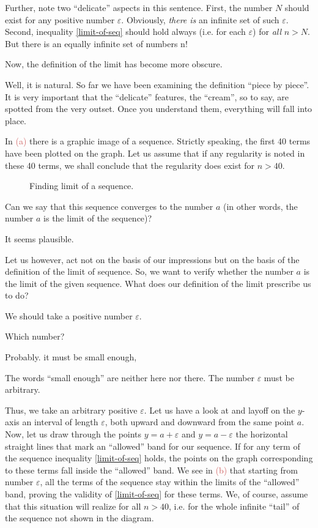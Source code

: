 {Further, note two ``delicate'' aspects in this sentence. First, the number $N$ should exist for any positive number $\varepsilon$. Obviously, \emph{there is} an infinite set of such $\varepsilon$. Second, inequality \eqref{limit-of-seq} should hold always (i.e. for each $\varepsilon$) for \emph{all} $n > N$. But there is an equally infinite set of numbers n!

\rdr Now, the definition of the limit has become more obscure.

\athr Well, it is natural. So far we have been examining the definition ``piece by piece''. It is very important that the ``delicate'' features, the ``cream'', so to say, are spotted from the very outset. Once you understand them, everything will fall into place.

In \textcolor{IndianRed}{(a)} there is a graphic image of a sequence. Strictly speaking, the first 40 terms have been plotted on the graph. Let us assume that if any regularity is noted in these 40 terms, we shall conclude that the regularity does exist for $n > 40$.

\begin{figure}[!h]
\centering

\caption{Finding limit of a sequence.}
\label{fig-07}
\end{figure}

Can we say that this sequence converges to the number $a$ (in other words, the number $a$ is the limit of the sequence)?

\rdr It seems plausible.

\athr Let us however, act not on the basis of our impressions but on the basis of the definition of the limit of sequence. So, we want to verify whether the number $a$ is the limit of the given sequence. What does our definition of the limit prescribe us to do?

\rdr We should take a positive number $\varepsilon$. 

\athr Which number? 

\rdr Probably. it must be small enough,

\athr The words ``small enough'' are neither here nor there. The number $\varepsilon$ must be arbitrary.

Thus, we take an arbitrary positive $\varepsilon$. Let us have a look at  and layoff on the $y$-axis an interval of length $\varepsilon$, both upward and downward from the same point $a$. Now, let us draw through the points $y = a + \varepsilon$ and $y = a - \varepsilon$ the horizontal straight lines that mark an ``allowed'' band for our sequence. If for any term of the sequence inequality \eqref{limit-of-seq} holds, the points on the graph corresponding to these terms fall inside the ``allowed'' band. We see  in \textcolor{IndianRed}{(b)} that starting from number $\varepsilon$, all the terms of the sequence stay within the limits of the ``allowed'' band, proving the validity of \eqref{limit-of-seq} for these terms. We, of course, assume that this situation will realize for all $n > 40$, i.e. for the whole infinite ``tail'' of the sequence not shown in the diagram.

}
